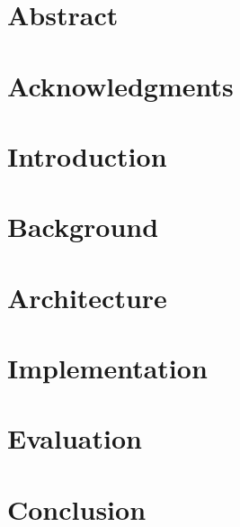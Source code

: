 

\chapter*{Abstract}

\chapter*{Acknowledgments}



\chapter{Introduction}



\chapter{Background}



\chapter{Architecture}



\chapter{Implementation}



\chapter{Evaluation}



\chapter{Conclusion}






